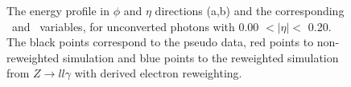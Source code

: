 \begin{figure}[htbp]
	\begin{tcolorbox}[colback=black!5!white,colframe=white!75!black]
    \caption{The energy profile in $\phi$ and $\eta$ directions (a,b) and the corresponding \Rphi \ and \Reta \ variables, for unconverted photons with 0.00 $ < |\eta| < $ 0.20. The black points correspond to the pseudo data, red points to non-reweighted simulation and blue points to the reweighted simulation from $Z\rightarrow ll\gamma$ with derived electron reweighting.}
    \label{Electron:1}
    \end{tcolorbox}
    
\end{figure}
